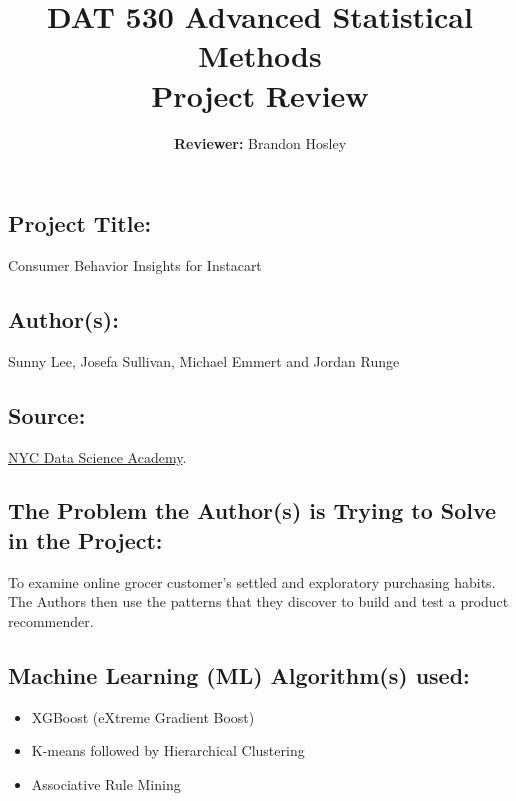 \documentclass[]{article}
\title{\textbf{DAT 530 Advanced Statistical Methods}\\
	\normalsize{Project Review} }
\author{\textbf{Reviewer: }
	Brandon Hosley}
\begin{document}
\setlength{\droptitle}{-10em} 
\pretitle{\begin{flushleft}\LARGE} %
	\posttitle{\end{flushleft}}
\preauthor{\begin{flushleft}\large} %
	\postauthor{\end{flushleft}}
\predate{\begin{flushleft}\large} %
	\postdate{\end{flushleft}}
\maketitle

\vspace{-2em}

\subsection*{Project Title:}
Consumer Behavior Insights for Instacart

\subsection*{Author(s):}
Sunny Lee, Josefa Sullivan, Michael Emmert and Jordan Runge

\subsection*{Source:}
\href{https://nycdatascience.com/blog/student-works/recommendations-for-online-groceries/}{NYC Data Science Academy}.

\subsection*{The Problem the Author(s) is Trying to Solve in the Project:}
To examine online grocer customer's settled and exploratory purchasing habits. \\
The Authors then use the patterns that they discover to build and test a product recommender.
 
\subsection*{Machine Learning (ML) Algorithm(s) used:}
\begin{itemize}
	\item XGBoost (eXtreme Gradient Boost)
	\item K-means followed by Hierarchical Clustering
	\item Associative Rule Mining
\end{itemize}
\end{document}
